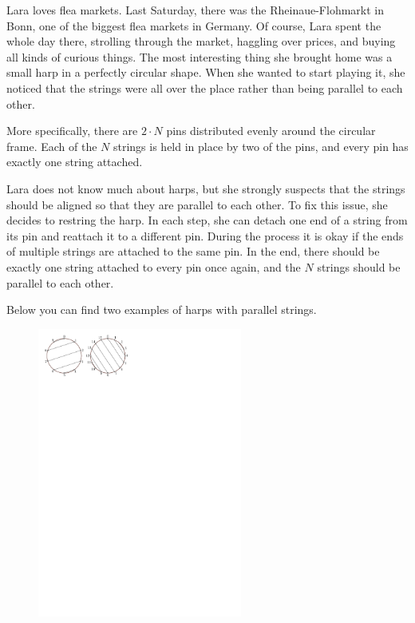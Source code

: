 
Lara loves flea markets.
Last Saturday, there was the Rheinaue-Flohmarkt in Bonn, one of the biggest flea markets in Germany.
Of course, Lara spent the whole day there, strolling through the market, haggling over prices, and buying all kinds of curious things.
The most interesting thing she brought home was a small harp in a perfectly circular shape.
When she wanted to start playing it, she noticed that the strings were all over the place rather than being parallel to each other.

More specifically, there are $2\cdot N$ pins distributed evenly around the circular frame.
Each of the $N$ strings is held in place by two of the pins, and every pin has exactly one string attached.

Lara does not know much about harps, but she strongly suspects that the strings should be aligned so that they are parallel to each other.
To fix this issue, she decides to restring the harp.
In each step, she can detach one end of a string from its pin and reattach it to a different pin.
During the process it is okay if the ends of multiple strings are attached to the same pin. In the end, there should be exactly one string attached to every pin once again, and the $N$ strings should be parallel to each other. 

Below you can find two examples of harps with parallel strings. 

\begin{figure}
\centering
\includegraphics[width=0.6\textwidth]{parallel}
\end{figure}


